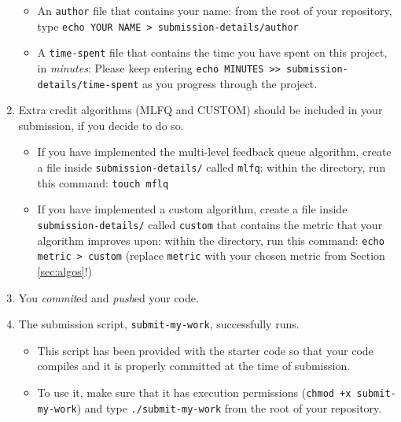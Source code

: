 \documentclass[main.tex]{subfiles}
\begin{document}
\begin{enumerate}
\begin{itemize}
        \item An \texttt{author} file that contains your name: from the root of your repository, type \texttt{echo YOUR NAME > submission-details/author}
        \item A \texttt{time-spent} file that contains the time you have spent on this project, in \emph{minutes}: Please keep entering \texttt{echo MINUTES >> submission-details/time-spent} as you progress through the project.
    \end{itemize}
    \item Extra credit algorithms (MLFQ and CUSTOM) should be included in your submission, if you decide to do so.
    \begin{itemize}
        \item If you have implemented the multi-level feedback queue algorithm, create a file inside \texttt{submission-details/} called \texttt{mlfq}: within the directory, run this command: \texttt{touch mflq}
        \item If you have implemented a custom algorithm, create a file inside \texttt{submission-details/} called \texttt{custom} that contains the metric that your algorithm improves upon: within the directory, run this command: \texttt{echo metric > custom} (replace \texttt{metric} with your chosen metric from Section \ref{sec:algos}!)
    \end{itemize}
    \item You \textit{commit}ed and \textit{push}ed your code. %
    \item The submission script, \texttt{submit-my-work}, successfully runs. 
    \begin{itemize}
        \item This script has been provided with the starter code so that your code compiles and it is properly committed at the time of submission.
        \item To use it, make sure that it has execution permissions (\texttt{chmod +x submit-my-work}) and type \texttt{./submit-my-work} from the root of your repository.
    \end{itemize} 
\end{enumerate}
\end{document}
